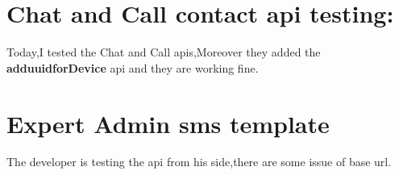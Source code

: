 \documentclass[12pt,a4paper]{article}
\begin{document}
	
 
 \clearpage
\section{Chat and Call contact api testing:}
Today,I tested the Chat and Call apis,Moreover they added the \textbf{adduuidforDevice} api and they are working fine.
\section{Expert Admin sms template}
The developer is testing the api from his side,there are some issue of base url.
\end{document}

